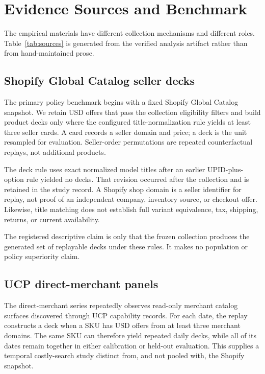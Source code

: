 \section{Evidence Sources and Benchmark}
\label{sec:benchmark}

The empirical materials have different collection mechanisms and different roles.
Table~\ref{tab:sources} is generated from the verified analysis artifact rather than
from hand-maintained prose.

\begin{table}[htbp]
  \centering
  
  \caption{Source-stratified evidence. The rows are intentionally not pooled: seller
  decks and UCP panels support separately calibrated recalled-search replays.}
  \label{tab:sources}
\end{table}

\subsection{Shopify Global Catalog seller decks}

The primary policy benchmark begins with a fixed Shopify Global Catalog snapshot.
We retain USD offers that pass the collection eligibility filters and build product
decks only where the configured title-normalization rule yields at least three seller
cards. A card records a seller domain and price; a deck is the unit resampled for
evaluation. Seller-order permutations are repeated counterfactual replays, not
additional products.

The deck rule uses exact normalized model titles after an earlier UPID-plus-option
rule yielded no decks. That revision occurred after the collection and is retained in
the study record. A Shopify shop domain is a seller identifier for replay, not
proof of an independent company, inventory source, or checkout offer. Likewise,
title matching does not establish full variant equivalence, tax, shipping, returns,
or current availability.

The registered descriptive claim is only that the frozen collection produces the
generated set of replayable decks under these rules. It makes no population or policy
superiority claim.

\subsection{UCP direct-merchant panels}

The direct-merchant series repeatedly observes read-only merchant catalog surfaces
discovered through UCP capability records. For each date, the replay constructs a
deck when a SKU has USD offers from at least three merchant domains. The same SKU
can therefore yield repeated daily decks, while all of its dates remain together in
either calibration or held-out evaluation. This supplies a temporal costly-search
study distinct from, and not pooled with, the Shopify snapshot.

